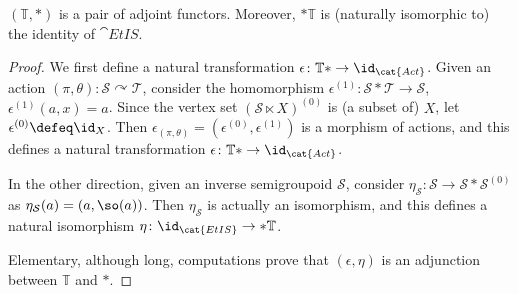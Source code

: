 \begin{proposition}
$(\mathbb{T},\ast)$ is a pair of adjoint functors. Moreover, $\ast\mathbb{T}$ is (naturally isomorphic to) the identity of $\cat{EtIS}$.
\end{proposition}
\begin{proof}
    We first define a natural transformation $\epsilon\colon\mathbb{T}\ast\to\id_{\cat{Act}}$. Given an action $(\pi,\theta)\colon\mathcal{S}\curvearrowright\mathcal{T}$, consider the homomorphism $\epsilon^{(1)}\colon\mathcal{S}\ast\mathcal{T}\to \mathcal{S}$, $\epsilon^{(1)}(a,x)=a$. Since the vertex set $(\mathcal{S}\ltimes X)^{(0)}$ is (a subset of) $X$, let $\epsilon^{(0)}\defeq\id_X$. Then $\epsilon_{(\pi,\theta)}=(\epsilon^{(0)},\epsilon^{(1)})$ is a morphism of actions, and this defines a natural transformation $\epsilon\colon \mathbb{T}\ast\to\id_{\cat{Act}}$.
    
    In the other direction, given an inverse semigroupoid $\mathcal{S}$, consider $\eta_{\mathcal{S}}\colon\mathcal{S}\to\mathcal{S}\ast\mathcal{S}^{(0)}$ as $\eta_{\mathcal{S}}(a)=(a,\so(a))$. Then $\eta_{\mathcal{S}}$ is actually an isomorphism, and this defines a natural isomorphism $\eta\colon\id_{\cat{EtIS}}\to\ast\mathbb{T}$.
    
    Elementary, although long, computations prove that $(\epsilon,\eta)$ is an adjunction between $\mathbb{T}$ and $\ast$.\qedhere
\end{proof}